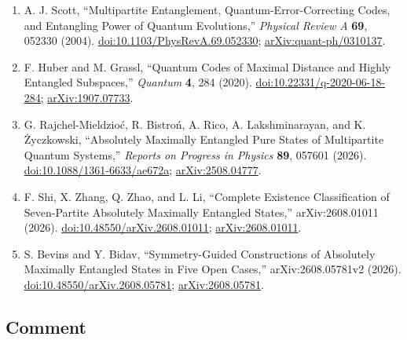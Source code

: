 \begin{enumerate}[label={},leftmargin=4.8em,labelsep=0.5em]
  \footnotesize
  \item[\textup{[Sco04]}]\label{ref:p45-scott}
  A. J. Scott,
  ``Multipartite Entanglement, Quantum-Error-Correcting Codes, and Entangling
  Power of Quantum Evolutions,'' \emph{Physical Review A} \textbf{69},
  052330 (2004).
  \href{https://doi.org/10.1103/PhysRevA.69.052330}{doi:10.1103/PhysRevA.69.052330};
  \href{https://arxiv.org/abs/quant-ph/0310137}{arXiv:quant-ph/0310137}.

  \item[\textup{[HG20]}]\label{ref:p45-huber-grassl}
  F. Huber and M. Grassl,
  ``Quantum Codes of Maximal Distance and Highly Entangled Subspaces,''
  \emph{Quantum} \textbf{4}, 284 (2020).
  \href{https://doi.org/10.22331/q-2020-06-18-284}{doi:10.22331/q-2020-06-18-284};
  \href{https://arxiv.org/abs/1907.07733}{arXiv:1907.07733}.

  \item[\textup{[RBR+26]}]\label{ref:p45-review}
  G. Rajchel-Mieldzio{\'c}, R. Bistro{\'n}, A. Rico, A. Lakshminarayan, and
  K. {\.{Z}}yczkowski,
  ``Absolutely Maximally Entangled Pure States of Multipartite Quantum
  Systems,'' \emph{Reports on Progress in Physics} \textbf{89}, 057601
  (2026).
  \href{https://doi.org/10.1088/1361-6633/ae672a}{doi:10.1088/1361-6633/ae672a};
  \href{https://arxiv.org/abs/2508.04777}{arXiv:2508.04777}.

  \item[\textup{[SZZL26]}]\label{ref:p45-shi}
  F. Shi, X. Zhang, Q. Zhao, and L. Li,
  ``Complete Existence Classification of Seven-Partite Absolutely Maximally
  Entangled States,'' arXiv:2608.01011 (2026).
  \href{https://doi.org/10.48550/arXiv.2608.01011}{doi:10.48550/arXiv.2608.01011};
  \href{https://arxiv.org/abs/2608.01011}{arXiv:2608.01011}.

  \item[\textup{[BB26]}]\label{ref:p45-bevins-bidav}
  S. Bevins and Y. Bidav,
  ``Symmetry-Guided Constructions of Absolutely Maximally Entangled States in
  Five Open Cases,'' arXiv:2608.05781v2 (2026).
  \href{https://doi.org/10.48550/arXiv.2608.05781}{doi:10.48550/arXiv.2608.05781};
  \href{https://arxiv.org/abs/2608.05781}{arXiv:2608.05781}.
\end{enumerate}

\subsection*{Comment}

